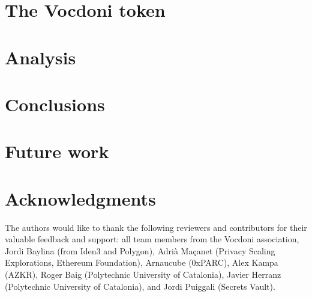 \documentclass[runningheads, draft]{llncs}
\begin{document}
\section{The Vocdoni token}
\label{sec:token}


\section{Analysis}
\label{sec:analysis}


\section{Conclusions}
\label{sec:conclusions}


\section{Future work}
\label{sec:future-work}


\section*{Acknowledgments}
\label{sec:acknowledgments}

The authors would like to thank the following reviewers and contributors for their valuable feedback and support: all team members from the Vocdoni association, Jordi Baylina (from Iden3 and Polygon), Adrià Maçanet (Privacy Scaling Explorations, Ethereum Foundation), Arnaucube (0xPARC), Alex Kampa (AZKR), Roger Baig (Polytechnic University of Catalonia), Javier Herranz (Polytechnic University of Catalonia), and Jordi Puiggali (Secrets Vault).





\end{document}
